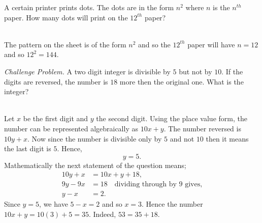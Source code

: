 \documentclass[addpoints,12pt]{exam}
\begin{document}
\begin{questions}
 \question A certain printer prints dots. The dots are in the form $n^2$ where $n$ is the $n^{th}$ 
paper. How many dots will print on the $12^{th}$ paper?
	\ifprintanswers
	  \begin{solution}\\
		The pattern on the sheet is of the form $n^2$ and so the $12^{th}$ paper will have $n=12$ 
and so $12^2=144$.
	  \end{solution}
	\else
	  \makeemptybox{1.33in}
	\fi


 \question \emph{Challenge Problem.} A two digit integer is divisible by $5$ but not by $10$. If 
the digits are reversed, the number is $18$ more then the original one. What is the integer?
	\ifprintanswers
	  \begin{solution}\\
		Let $x$ be the first digit and $y$ the second digit. Using the place value form, the number 
can be represented algebraically as $10x+y$. The number reversed is $10y+x$. Now since the number 
is divisible only by $5$ and not $10$ then it means the last digit is $5$. Hence, $$y=5.$$ 
Mathematically the next statement of the question means;
		\begin{align*}
		 10y+x &= 10x+y + 18, \\
		 9y -9x &= 18 \quad \text{dividing through by $9$ gives,}\\
		 y - x &= 2.
		\end{align*}
Since $y=5$, we have $5-x=2$ and so $x=3$. Hence the number $10x+y=10(3)+5 = 35$. Indeed, 
$53=35+18$.
	  \end{solution}
	\else
	  \makeemptybox{1.33in}
	\fi
\end{questions}
\vspace*{1cm}
\end{document}
